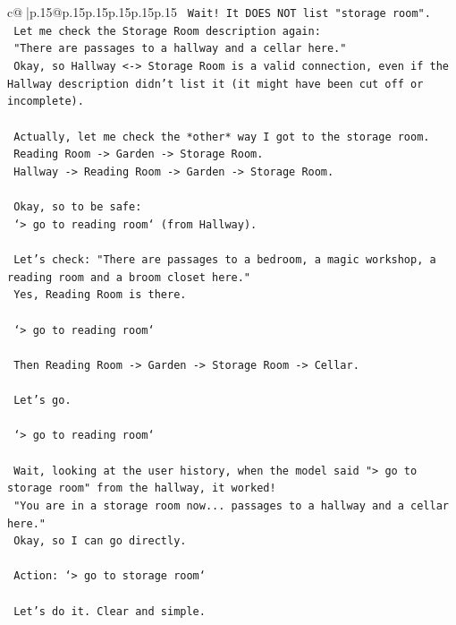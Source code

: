 \documentclass{article}
\begin{document}
{\begin{supertabular}{c@{$\;$}|p{.15\linewidth}@{}p{.15\linewidth}p{.15\linewidth}p{.15\linewidth}p{.15\linewidth}p{.15\linewidth}}
{{{\texttt{    Wait! It DOES NOT list "storage room".} \\
\texttt{    Let me check the Storage Room description again:} \\
\texttt{    "There are passages to a hallway and a cellar here."} \\
\texttt{    Okay, so Hallway <{-}> Storage Room is a valid connection, even if the Hallway description didn't list it (it might have been cut off or incomplete).} \\
\\ 
\texttt{    Actually, let me check the *other* way I got to the storage room.} \\
\texttt{    Reading Room {-}> Garden {-}> Storage Room.} \\
\texttt{    Hallway {-}> Reading Room {-}> Garden {-}> Storage Room.} \\
\\ 
\texttt{    Okay, so to be safe:} \\
\texttt{    `> go to reading room` (from Hallway).} \\
\\ 
\texttt{    Let's check: "There are passages to a bedroom, a magic workshop, a reading room and a broom closet here."} \\
\texttt{    Yes, Reading Room is there.} \\
\\ 
\texttt{    `> go to reading room`} \\
\\ 
\texttt{    Then Reading Room {-}> Garden {-}> Storage Room {-}> Cellar.} \\
\\ 
\texttt{    Let's go.} \\
\\ 
\texttt{    `> go to reading room`} \\
\\ 
\texttt{    Wait, looking at the user history, when the model said "> go to storage room" from the hallway, it worked!} \\
\texttt{    "You are in a storage room now... passages to a hallway and a cellar here."} \\
\texttt{    Okay, so I can go directly.} \\
\\ 
\texttt{    Action: `> go to storage room`} \\
\\ 
\texttt{    Let's do it. Clear and simple.} \\
}}}
\end{supertabular}}
\end{document}
